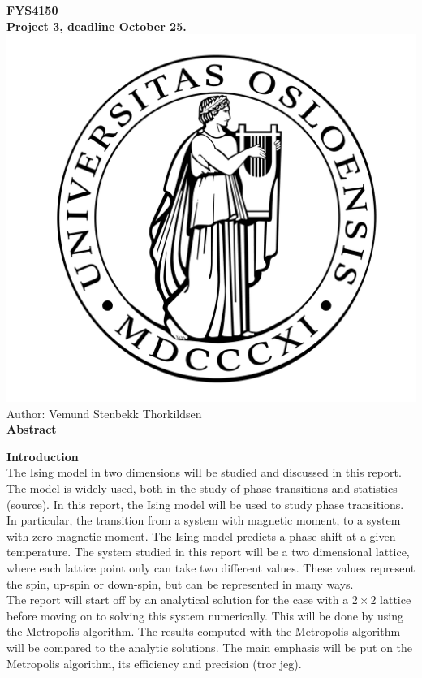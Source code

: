 \documentclass[10pt,a4paper]{article}
\begin{document}
\begin{center}


{\LARGE\bf
FYS4150\\
\vspace{0.5cm}
Project 3, deadline October 25.
}
 \includegraphics[scale=0.075]{uio.png}\\
Author: Vemund Stenbekk Thorkildsen\\
\vspace{1cm}
{\LARGE\bf
Abstract
}\\
\end{center}
\newpage
{\LARGE\bf
Introduction
}\\
\noindent The Ising model in two dimensions will be studied and discussed in this report. The model is widely used, both in the study of phase transitions and statistics (source). In this report, the Ising model will be used to study phase transitions. In particular, the transition from a system with magnetic moment, to a system with zero magnetic moment. The Ising model predicts a phase shift at a given temperature. The system studied in this report will be a two dimensional lattice, where each lattice point only can take two different values. These values represent the spin, up-spin or down-spin, but can be represented in many ways. \\

\noindent The report will start off by an analytical solution for the case with a $2 \times 2$ lattice before moving on to solving this system numerically. This will be done by using the Metropolis algorithm. The results computed with the Metropolis algorithm will be compared to the analytic solutions. The main emphasis will be put on the Metropolis algorithm, its efficiency and precision (tror jeg).\\ 
\end{document}
